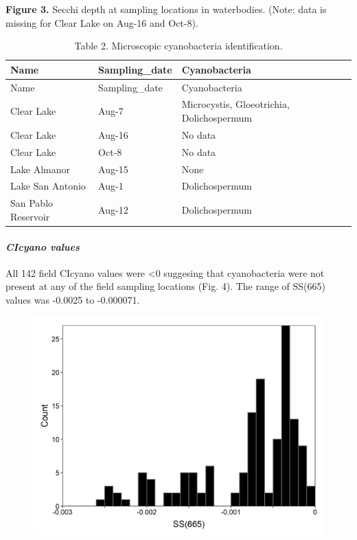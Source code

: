 \documentclass[]{article}
\let\oldparagraph\paragraph
\renewcommand{\paragraph}[1]{\oldparagraph{#1}\mbox{}}
\begin{document}
\textbf{Figure 3.} Secchi depth at sampling locations in waterbodies.
(Note: data is missing for Clear Lake on Aug-16 and Oct-8).

\begin{longtable}[]{@{}lll@{}}
\caption{Table 2. Microscopic cyanobacteria
identification.}\tabularnewline
\toprule
Name & Sampling\_date & Cyanobacteria\tabularnewline
\midrule
\endfirsthead
\toprule
Name & Sampling\_date & Cyanobacteria\tabularnewline
\midrule
\endhead
Clear Lake & Aug-7 & Microcystis, Gloeotrichia,
Dolichospermum\tabularnewline
Clear Lake & Aug-16 & No data\tabularnewline
Clear Lake & Oct-8 & No data\tabularnewline
Lake Almanor & Aug-15 & None\tabularnewline
Lake San Antonio & Aug-1 & Dolichospermum\tabularnewline
San Pablo Reservoir & Aug-12 & Dolichospermum\tabularnewline
\bottomrule
\end{longtable}

\hypertarget{cicyano-values}{%
\paragraph{\texorpdfstring{\emph{CIcyano
values}}{CIcyano values}}\label{cicyano-values}}

All 142 field CIcyano values were \textless0 suggesing that
cyanobacteria were not present at any of the field sampling locations
(Fig. 4). The range of SS(665) values was -0.0025 to -0.000071.

\begin{figure}
\includegraphics[width=33.33in]{../Data/Figures_output/ss665_hist} \end{figure}
\end{document}

